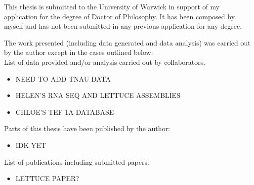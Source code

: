 This thesis is submitted to the University of Warwick in support of my application for the degree of Doctor of Philosophy. It has been composed by myself and has not been submitted in any previous application for any degree.

The work presented (including data generated and data analysis) was carried out by the author except in the cases outlined below:\\

\noindent
List of data provided and/or analysis carried out by collaborators.
\begin{itemize}
    \item NEED TO ADD TNAU DATA 
    \item HELEN'S RNA SEQ AND LETTUCE ASSEMBLIES
    \item CHLOE'S TEF-1A DATABASE 
\end{itemize} 

\noindent
Parts of this thesis have been published by the author:
\begin{itemize}
    \item IDK YET
\end{itemize} 

\noindent
List of publications including submitted papers.
\begin{itemize}
    \item LETTUCE PAPER? 
\end{itemize}